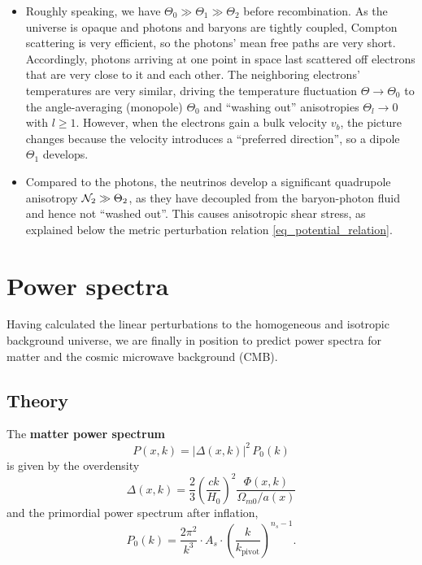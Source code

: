 \documentclass[10pt,a4paper]{article}
\begin{document}
\begin{itemize}
\item
Roughly speaking, we have $\Theta_0 \gg \Theta_1 \gg \Theta_2$ before recombination.
As the universe is opaque and photons and baryons are tightly coupled,
Compton scattering is very efficient, so the photons' mean free paths are very short.
Accordingly, photons arriving at one point in space last scattered off electrons that are very close to it and each other.
The neighboring electrons' temperatures are very similar,
driving the temperature fluctuation $\Theta \rightarrow \Theta_0$
to the angle-averaging (monopole) $\Theta_0$ and ``washing out'' anisotropies $\Theta_l \rightarrow 0$ with $l \geq 1$.
However, when the electrons gain a bulk velocity $v_b$,
the picture changes because the velocity introduces a ``preferred direction'',
so a dipole $\Theta_1$ develops.

\item
Compared to the photons, the neutrinos develop a significant quadrupole anisotropy $\mathcal{N}_2 \gg \Theta_2$,
as they have decoupled from the baryon-photon fluid and hence not ``washed out''.
This causes anisotropic shear stress, as explained below the metric perturbation relation \eqref{eq_potential_relation}.
\end{itemize}

\clearpage
\section{Power spectra}
\label{sec_power_spectra}

Having calculated the linear perturbations to the homogeneous and isotropic background universe,
we are finally in position to predict power spectra for matter and the cosmic microwave background (CMB).

\subsection{Theory}

The \textbf{matter power spectrum}
\begin{equation}
	P(x,k) = |\Delta(x,k)|^2 \, P_0(k)
\label{eq_Pk}
\end{equation}
is given by the overdensity
\begin{equation}
	\Delta(x,k) = \frac23 \left( \frac{ck}{H_0} \right)^2 \frac{\Phi(x,k)}{\Omega_{m0}/a(x)}
\end{equation}
and the primordial power spectrum after inflation,
\begin{equation}
	P_0(k) = \frac{2\pi^2}{k^3} \cdot A_s \cdot \left( \frac{k}{k_\text{pivot}} \right)^{n_s-1}.
\label{eq_P_primordial}
\end{equation}
\end{document}
